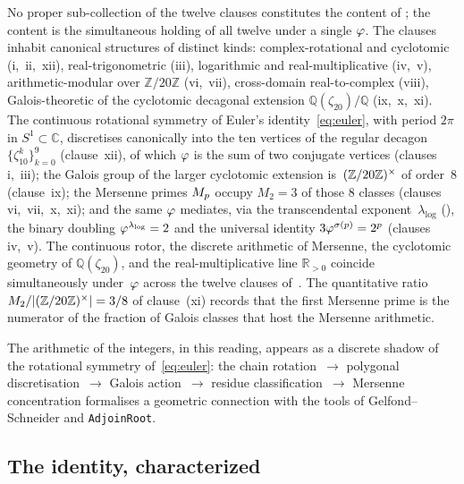 \begin{Remark}\label{rem:euler-reading}
No proper sub-collection of the twelve clauses constitutes the content
of ; the content is the simultaneous holding
of all twelve under a single $\varphi$.  The clauses inhabit canonical
structures of distinct kinds: complex-rotational and cyclotomic
(i,~ii,~xii), real-trigonometric (iii), logarithmic and
real-multiplicative (iv,~v), arithmetic-modular over $\mathbb{Z}/20\mathbb{Z}$
(vi,~vii), cross-domain real-to-complex (viii), Galois-theoretic of the
cyclotomic decagonal extension $\mathbb{Q}(\zeta_{20})/\mathbb{Q}$
(ix,~x,~xi).  The continuous rotational symmetry of
Euler's identity~\eqref{eq:euler}, with period $2\pi$ in
$S^{1}\subset\mathbb{C}$, discretises canonically into the ten
vertices of the regular decagon
$\{\zeta_{10}^{k}\}_{k=0}^{9}$ (clause~xii), of which $\varphi$ is the
sum of two conjugate vertices (clauses i,~iii); the Galois group of
the larger cyclotomic extension is~$(\mathbb{Z}/20\mathbb{Z})^{\times}$ of order~$8$
(clause~ix); the Mersenne primes $M_{p}$ occupy $M_{2}=3$ of those $8$
classes (clauses vi,~vii,~x,~xi); and the same $\varphi$ mediates, via
the transcendental exponent~$\lambda_{\log}$ (),
the binary doubling $\varphi^{\lambda_{\log}}=2$ and the universal
identity $3\varphi^{\sigma(p)}=2^{p}$ (clauses iv,~v).  The continuous
rotor, the discrete arithmetic of Mersenne, the cyclotomic geometry of
$\mathbb{Q}(\zeta_{20})$, and the real-multiplicative line
$\mathbb{R}_{>0}$ coincide simultaneously under~$\varphi$ across the
twelve clauses of~.  The quantitative ratio
$M_{2}/|(\mathbb{Z}/20\mathbb{Z})^{\times}|=3/8$ of clause~(xi) records that the first Mersenne
prime is the numerator of the fraction of Galois classes that host
the Mersenne arithmetic.

The arithmetic of the integers, in this reading, appears as a discrete
shadow of the rotational symmetry of~\eqref{eq:euler}: the chain
rotation~$\to$ polygonal discretisation~$\to$ Galois action~$\to$
residue classification~$\to$ Mersenne concentration formalises a
geometric connection with the tools of Gelfond--Schneider and
\texttt{AdjoinRoot}.
\end{Remark}

\subsection{The identity, characterized}
\label{ssec:characterization}

